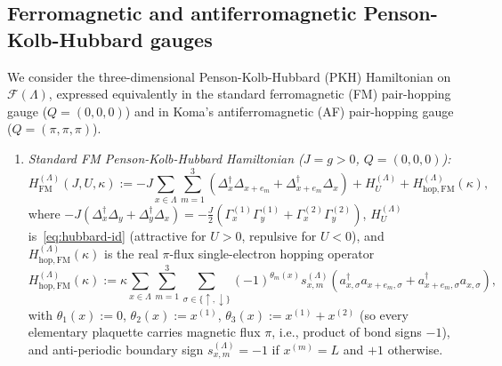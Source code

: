 \documentclass[11pt]{article}
\theoremstyle{definition}
\theoremstyle{remark}
\newcommand{\calF}{\mathcal{F}}
\begin{document}
\subsection{Ferromagnetic and antiferromagnetic Penson-Kolb-Hubbard gauges}\label{subsec:gauges}

We consider the three-dimensional Penson-Kolb-Hubbard (PKH) Hamiltonian on $\calF(\Lambda)$, expressed equivalently in the standard ferromagnetic (FM) pair-hopping gauge ($Q = (0,0,0)$) and in Koma's antiferromagnetic (AF) pair-hopping gauge ($Q = (\pi,\pi,\pi)$).

\begin{enumerate}[label=\arabic*.,leftmargin=2em]
\item \emph{Standard FM Penson-Kolb-Hubbard Hamiltonian ($J = g > 0$, $Q = (0,0,0)$):}
\begin{equation}\label{eq:H-FM}
H_{\mathrm{FM}}^{(\Lambda)}(J, U, \kappa) := -J \sum_{x \in \Lambda} \sum_{m=1}^3 \left(\Delta_x^\dagger \Delta_{x+e_m} + \Delta_{x+e_m}^\dagger \Delta_x\right) + H_U^{(\Lambda)} + H_{\mathrm{hop},\mathrm{FM}}^{(\Lambda)}(\kappa),
\end{equation}
where $-J(\Delta_x^\dagger \Delta_y + \Delta_y^\dagger \Delta_x) = -\frac{J}{2}(\Gamma_x^{(1)}\Gamma_y^{(1)} + \Gamma_x^{(2)}\Gamma_y^{(2)})$, $H_U^{(\Lambda)}$ is~\eqref{eq:hubbard-id} (attractive for $U > 0$, repulsive for $U < 0$), and $H_{\mathrm{hop},\mathrm{FM}}^{(\Lambda)}(\kappa)$ is the real $\pi$-flux single-electron hopping operator
\begin{equation}\label{eq:H-hop-FM}
H_{\mathrm{hop},\mathrm{FM}}^{(\Lambda)}(\kappa) := \kappa \sum_{x \in \Lambda} \sum_{m=1}^3 \sum_{\sigma \in \{\uparrow,\downarrow\}} (-1)^{\theta_m(x)} s_{x,m}^{(\Lambda)} \left(a_{x,\sigma}^\dagger a_{x+e_m,\sigma} + a_{x+e_m,\sigma}^\dagger a_{x,\sigma}\right),
\end{equation}
with $\theta_1(x) := 0$, $\theta_2(x) := x^{(1)}$, $\theta_3(x) := x^{(1)} + x^{(2)}$ (so every elementary plaquette carries magnetic flux $\pi$, i.e., product of bond signs $-1$), and anti-periodic boundary sign $s_{x,m}^{(\Lambda)} = -1$ if $x^{(m)} = L$ and $+1$ otherwise.


\end{enumerate}
\end{document}
